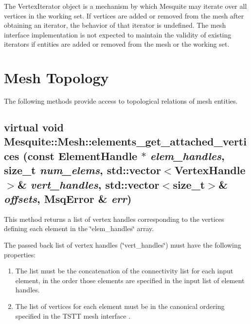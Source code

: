 The VertexIterator object is a mechanism by which Mesquite may iterate over all vertices in the working set.  If vertices are added or removed from the mesh after obtaining an iterator, the behavior of that iterator is undefined.  The mesh interface implementation is not expected to maintain the validity of existing iterators if entities are added or removed from the mesh or the working set.

\section{Mesh Topology}

The following methods provide access to topological relations of mesh entities.

\subsection{\setlength{\rightskip}{0pt plus 5cm}virtual void Mesquite::Mesh::elements\_\-get\_\-attached\_\-vertices (const Element\-Handle $\ast$ {\em elem\_\-handles}, size\_\-t {\em num\_\-elems}, std::vector$<$VertexHandle$>$\& {\em vert\_handles}, std::vector$<$size\_t$>$\& {\em offsets}, {\bf Msq\-Error} \& {\em err})\hspace{0.3cm}{\tt  [pure virtual]}}\label{classMesquite_1_1Mesh_a18}

This method returns a list of vertex handles corresponding to the vertices defining each element in the \char`\"{}elem\_\-handles\char`\"{} array.

The passed back list of vertex handles (\char`\"{}vert\_\-handles\char`\"{}) must have the following properties:
\begin{enumerate}
\item The list must be the concatenation of the connectivity list for each input element, in the order those elements are specified
in the input list of element handles.
\item The list of vertices for each element must be in the canonical ordering specified in the TSTT mesh interface \cite{tstt}.
\end{enumerate}

